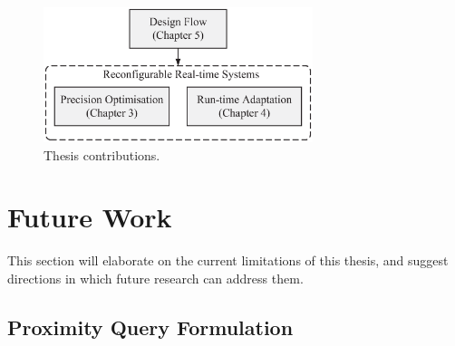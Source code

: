 \begin{figure}[ht]
\begin{center}
\includegraphics[width=0.7\textwidth]{1_introduction/figures/organisation}
\end{center}
\caption{Thesis contributions.}
\label{fig:intro_organisation_ch6}
\end{figure}

\section{Future Work}

This section will elaborate on the current limitations of this thesis, and suggest directions in which future research can address them.

\subsection{Proximity Query Formulation}

